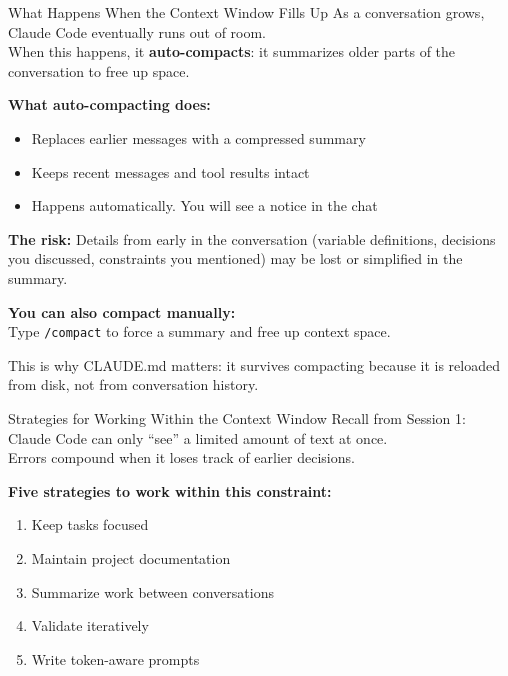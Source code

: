 \documentclass[aspectratio=169, 11pt]{beamer}
\begin{document}
\begin{frame}{What Happens When the Context Window Fills Up}
    As a conversation grows, Claude Code eventually runs out of room.\\
    When this happens, it \textbf{auto-compacts}: it summarizes older parts of the conversation to free up space.

    \vspace{0.5em}
    \textbf{What auto-compacting does:}
    \begin{itemize}
      \item Replaces earlier messages with a compressed summary
      \item Keeps recent messages and tool results intact
      \item Happens automatically. You will see a notice in the chat
    \end{itemize}

    \vspace{0.5em}
    \textbf{The risk:} Details from early in the conversation (variable definitions, decisions you discussed, constraints you mentioned) may be lost or simplified in the summary.

    \vspace{0.5em}
    \textbf{You can also compact manually:}\\
    Type \texttt{/compact} to force a summary and free up context space.

    \vspace{0.5em}
    \alert{This is why CLAUDE.md matters:} it survives compacting because it is reloaded from disk, not from conversation history.
\end{frame}

\begin{frame}{Strategies for Working Within the Context Window}
  Recall from Session 1: Claude Code can only ``see'' a limited amount of text at once.\\
  Errors compound when it loses track of earlier decisions.

  \vspace{0.5em}
  \textbf{Five strategies to work within this constraint:}
  \begin{enumerate}
    \item Keep tasks focused
    \item Maintain project documentation
    \item Summarize work between conversations
    \item Validate iteratively
    \item Write token-aware prompts
  \end{enumerate}
\end{frame}
\end{document}
